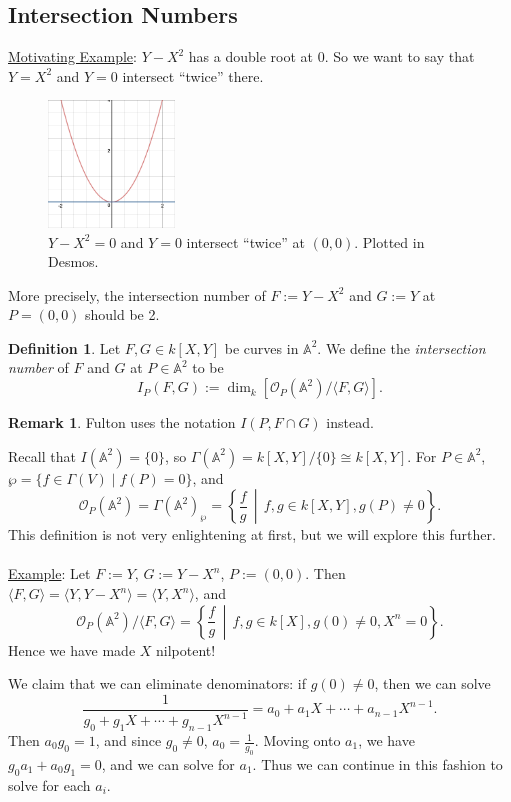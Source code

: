 \documentclass[12pt]{article}
\newcommand{\ita}[1]{\textit{#1}}
\newcommand{\vbrack}[1]{\langle #1\rangle}
\theoremstyle{definition}
\newtheorem{definition}[theorem]{Definition}
\newtheorem*{remark}{Remark}
\begin{document}
\subsection{Intersection Numbers}
\underline{Motivating Example}: $Y-X^2$ has a double root at 0. So we want to say that $Y=X^2$ and $Y=0$ intersect ``twice'' there. 
\begin{figure}[H]
    \centering
    \includegraphics[width=0.3\textwidth]{23.png}
    \caption{$Y-X^2=0$ and $Y=0$ intersect ``twice'' at $(0,0)$. Plotted in Desmos.}
\end{figure}
More precisely, the intersection number of $F:=Y-X^2$ and $G:=Y$ at $P=(0,0)$ should be 2.
\begin{definition}
    Let $F,G\in k[X,Y]$ be curves in $\mathbb{A}^2$. We define the \ita{intersection number} of $F$ and $G$ at $P\in\mathbb{A}^2$ to be
    \begin{equation}
        I_P(F,G):=\dim_k\left[\mathcal{O}_P(\mathbb{A}^2)/\vbrack{F,G}\right].
    \end{equation}
\end{definition}
\begin{remark}
   Fulton uses the notation $I(P,F\cap G)$ instead.
\end{remark}
Recall that $I(\mathbb{A}^2)=\{0\}$, so $\Gamma(\mathbb{A}^2)=k[X,Y]/\{0\}\cong k[X,Y]$. For $P\in\mathbb{A}^2$, $\wp=\{f\in\Gamma(V)\mid f(P)=0\}$, and
\[\mathcal{O}_P(\mathbb{A}^2)=\Gamma(\mathbb{A}^2)_{\wp}=\left\{\frac{f}{g}\,\middle|\,f,g\in k[X,Y],g(P)\neq0\right\}.\]
This definition is not very enlightening at first, but we will explore this further.\\\\
\underline{Example}: Let $F:=Y$, $G:=Y-X^n$, $P:=(0,0)$. Then $\vbrack{F,G}=\vbrack{Y,Y-X^n}=\vbrack{Y,X^n}$, and 
\[\mathcal{O}_P(\mathbb{A}^2)/\vbrack{F,G}=\left\{\frac{f}{g}\,\middle|\,f,g\in k[X],g(0)\neq0,X^n=0\right\}.\]
Hence we have made $X$ nilpotent!

We claim that we can eliminate denominators: if $g(0)\neq0$, then we can solve
\[\frac{1}{g_0+g_1X+\dotsb+g_{n-1}X^{n-1}}=a_0+a_1X+\dotsb+a_{n-1}X^{n-1}.\]
Then $a_0g_0=1$, and since $g_0\neq0$, $a_0=\frac{1}{g_0}$. Moving onto $a_1$, we have $g_0a_1+a_0g_1=0$, and we can solve for $a_1$. Thus we can continue in this fashion to solve for each $a_i$.
\end{document}
